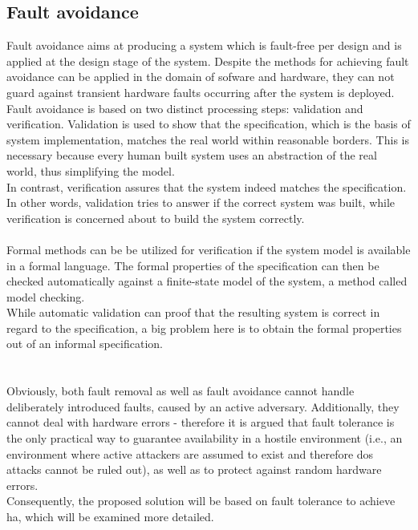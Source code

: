 \subsection{Fault avoidance}
Fault avoidance aims at producing a system which is fault-free
per design and is applied at the design stage of the system. Despite the methods for achieving fault avoidance can be applied in the domain of sofware and hardware,
they can not guard against transient hardware faults occurring after the system is deployed.
\\
Fault avoidance is based on two distinct processing steps: validation and verification. Validation is used to show that the specification, which is
the basis of system implementation, matches the real world within reasonable borders. This is necessary because every human built system uses an abstraction
of the real world, thus simplifying the model.
\\
In contrast, verification assures that the system indeed matches the specification. In other words, validation tries to answer if the correct system was built,
while verification is concerned about to build the system correctly.
\\
\\
Formal methods can be be utilized for verification if the system model is available in a formal language. The formal properties of the specification can then be 
checked automatically against a finite-state model of the system, a method called model checking.
\\
While automatic validation can proof that the resulting system is correct in regard to the specification, a big problem here is to obtain the formal properties
out of an informal specification.
\\
\\
\\
Obviously, both fault removal as well as fault avoidance cannot handle deliberately introduced faults, caused by an active adversary.
Additionally, they cannot deal with hardware errors -  therefore it is argued that fault tolerance is the only practical way to guarantee availability
in a hostile environment (i.e., an environment where active attackers are assumed to exist and therefore \gls{dos} attacks cannot be ruled out), as well as to
protect against random hardware errors.
\\
Consequently, the proposed solution will be based on fault tolerance to achieve \gls{ha}, which will be examined more detailed.
 
